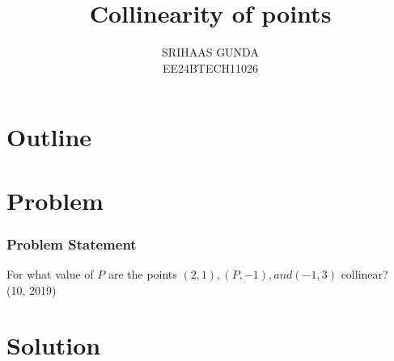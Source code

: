 \documentclass{beamer}
\title{Collinearity of points}
\author{SRIHAAS GUNDA \\ EE24BTECH11026}
\date{}
\theoremstyle{remark}
\newcommand{\myvec}[1]{\ensuremath{\begin{pmatrix}#1\end{pmatrix}}}
\let\vec\mathbf
\numberwithin{equation}{section}
\begin{document}
\begin{frame}
\titlepage
\end{frame}

\section*{Outline}
\begin{frame}
\tableofcontents
\end{frame}
\section{Problem}
\begin{frame}
\frametitle{Problem Statement}
 For what value of $P$  are the points $(2,1),(P,-1),and(-1,3)$ collinear? \\
    \hfill (10, 2019)
\end{frame}

\section{Solution}
\end{document}
